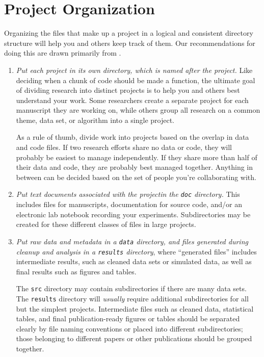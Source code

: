 \documentclass[10pt]{article}
\newcommand{\recommend}[1]{\textit{#1}}
\begin{document}
\section{Project Organization}\label{sec:project}

Organizing the files that make up a project in a logical and
consistent directory structure will help you and others keep track of
them.  Our recommendations for doing this are drawn primarily from
\cite{noble2009,gentzkow2014}.

\begin{enumerate}

\item
  \recommend{Put each project in its own directory, which is named
    after the project.}  Like deciding when a chunk of code should be
  made a function, the ultimate goal of dividing research into
  distinct projects is to help you and others best understand your
  work. Some researchers create a separate project for each manuscript
  they are working on, while others group all research on a common
  theme, data set, or algorithm into a single project.
    
  As a rule of thumb, divide work into projects based on the overlap
  in data and code files. If two research efforts share no data or
  code, they will probably be easiest to manage independently. If they
  share more than half of their data and code, they are probably best
  managed together. Anything in between can be decided based on the
  set of people you're collaborating with.

\item
  \recommend{Put text documents associated with the projectin the
    \texttt{doc} directory.} This includes files for manuscripts,
  documentation for source code, and/or an electronic lab notebook
  recording your experiments.  Subdirectories may be created for these
  different classes of files in large projects.

\item
  \recommend{Put raw data and metadata in a \texttt{data} directory,
    and files generated during cleanup and analysis in a
    \texttt{results} directory}, where ``generated files'' includes
  intermediate results, such as cleaned data sets or simulated data,
  as well as final results such as figures and tables.

  The \texttt{src} directory may contain subdirectories if there are
  many data sets.  The \texttt{results} directory will \emph{usually}
  require additional subdirectories for all but the simplest
  projects. Intermediate files such as cleaned data, statistical
  tables, and final publication-ready figures or tables should be
  separated clearly by file naming conventions or placed into
  different subdirectories; those belonging to different papers or
  other publications should be grouped together.


\end{enumerate}
\end{document}
